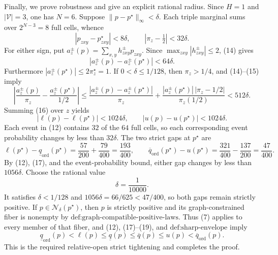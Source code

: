 Finally, we prove robustness and give an explicit rational radius.  Since \(H=1\) and \(|\mathcal V|=3\), one has \(N=6\).  Suppose \(\lVert p-p^{\star}\rVert_{\infty}<\delta\).  Each triple marginal sums over \(2^{N-3}=8\) full cells, whence
\[
|p_{zxy}-p^{\star}_{zxy}|<8\delta,
\qquad
|\pi_z-\tfrac12|<32\delta.
\tag{14}
\]
For either sign, put \(a_z^{\pm}(p)=\sum_{x,y}h^{\pm}_{zxy}p_{zxy}\).  Since \(\max_{zxy}|h^{\pm}_{zxy}|\le2\), (14) gives
\[
|a_z^{\pm}(p)-a_z^{\pm}(p^{\star})|<64\delta.
\tag{15}
\]
Furthermore \(|a_z^{\pm}(p^{\star})|\le 2\pi_z^{\star}=1\).  If \(0<\delta\le1/128\), then \(\pi_z>1/4\), and (14)--(15) imply
\[
\left|
\frac{a_z^{\pm}(p)}{\pi_z}
-\frac{a_z^{\pm}(p^{\star})}{1/2}
\right|
\le
\frac{|a_z^{\pm}(p)-a_z^{\pm}(p^{\star})|}{\pi_z}
+\frac{|a_z^{\pm}(p^{\star})|\,|\pi_z-1/2|}{\pi_z(1/2)}
<512\delta.
\tag{16}
\]
Summing (16) over \(z\) yields
\[
|\ell(p)-\ell(p^{\star})|<1024\delta,
\qquad
|u(p)-u(p^{\star})|<1024\delta.
\tag{17}
\]
Each event in (12) contains \(32\) of the \(64\) full cells, so each corresponding event probability changes by less than \(32\delta\).  The two strict gaps at \(p^{\star}\) are
\[
\ell(p^{\star})-\underline q_{\mathrm{ord}}(p^{\star})
=\frac{57}{200}+\frac{79}{400}=\frac{193}{400},
\qquad
\overline q_{\mathrm{ord}}(p^{\star})-u(p^{\star})
=\frac{321}{400}-\frac{137}{200}=\frac{47}{400}.
\tag{18}
\]
By (12), (17), and the event-probability bound, either gap changes by less than \(1056\delta\).  Choose the rational value
\[
\delta=\frac{1}{10000}.
\tag{19}
\]
It satisfies \(\delta<1/128\) and \(1056\delta=66/625<47/400\), so both gaps remain strictly positive.  If \(p\in\mathcal N_{\delta}(p^{\star})\), then \(p\) is strictly positive and its graph-constrained fiber is nonempty by \(\text{def:graph-compatible-positive-laws}\).  Thus (7) applies to every member of that fiber, and (12), (17)--(19), and \(\text{def:sharp-envelope}\) imply
\[
\underline q_{\mathrm{ord}}(p)<\ell(p)\le\underline q(p)
\le\overline q(p)\le u(p)<\overline q_{\mathrm{ord}}(p).
\tag{20}
\]
This is the required relative-open strict tightening and completes the proof.
